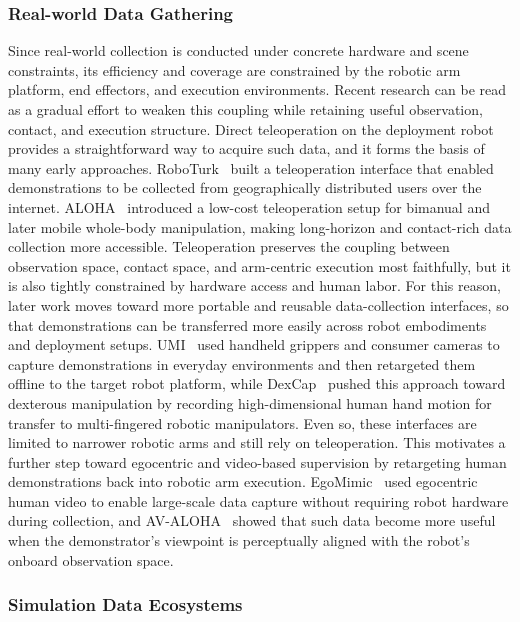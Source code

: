 \documentclass[acmsmall,screen,review]{acmart}
\begin{document}
\subsubsection{Real-world Data Gathering}\label{sec:real_acquisition}

Since real-world collection is conducted under concrete hardware and scene constraints, its efficiency and coverage are constrained by the robotic arm platform, end effectors, and execution environments. 
Recent research can be read as a gradual effort to weaken this coupling while retaining useful observation, contact, and execution structure. 
Direct teleoperation on the deployment robot provides a straightforward way to acquire such data, and it forms the basis of many early approaches.
RoboTurk~\cite{mandlekar2018roboturk} built a teleoperation interface that enabled demonstrations to be collected from geographically distributed users over the internet. 
ALOHA~\cite{zhao2023learning, fu2024mobile} introduced a low-cost teleoperation setup for bimanual and later mobile whole-body manipulation, making long-horizon and contact-rich data collection more accessible. 
Teleoperation preserves the coupling between observation space, contact space, and arm-centric execution most faithfully, but it is also tightly constrained by hardware access and human labor. 
For this reason, later work moves toward more portable and reusable data-collection interfaces, so that demonstrations can be transferred more easily across robot embodiments and deployment setups.
UMI~\cite{chi2024umi} used handheld grippers and consumer cameras to capture demonstrations in everyday environments and then retargeted them offline to the target robot platform, 
while DexCap~\cite{wang2024dexcap} pushed this approach toward dexterous manipulation by recording high-dimensional human hand motion for transfer to multi-fingered robotic manipulators.
Even so, these interfaces are limited to narrower robotic arms and still rely on teleoperation. 
This motivates a further step toward egocentric and video-based supervision by retargeting human demonstrations back into robotic arm execution.
EgoMimic~\cite{kareer2025egomimic} used egocentric human video to enable large-scale data capture without requiring robot hardware during collection, 
and AV-ALOHA~\cite{chuang2025avaloha} showed that such data become more useful when the demonstrator's viewpoint is perceptually aligned with the robot's onboard observation space. 

\subsubsection{Simulation Data Ecosystems}\label{sec:simulation_infrastructure}
\end{document}
